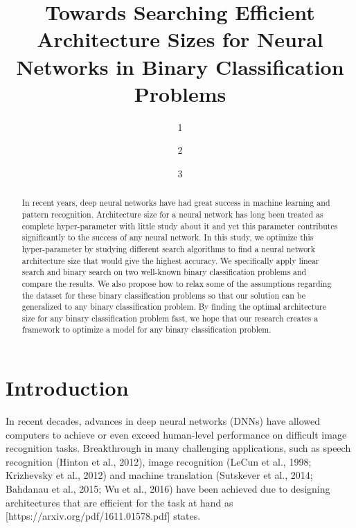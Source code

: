 \documentclass[runningheads]{llncs}
\begin{document}
%
\title{Towards Searching Efficient Architecture Sizes for Neural Networks in Binary Classification Problems}
\author{1
\and 2
\and 3}
%
\titlerunning{}
%
%
%
%
\maketitle              %
%
\begin{abstract}

In recent years, deep neural networks have had great success in machine learning and pattern recognition. Architecture size for a neural network has long been treated as complete hyper-parameter with little study about it and yet this parameter contributes significantly to the success of any neural network. In this study, we optimize this hyper-parameter by studying different search algorithms to find a neural network architecture size that would give the highest accuracy. We specifically apply linear search and binary search on two well-known binary classification problems and compare the results. We also propose how to relax some of the assumptions regarding the dataset for these binary classification problems so that our solution can be generalized to any binary classification problem. By finding the optimal architecture size for any binary classification problem fast, we hope that our research creates a framework to optimize a model for any binary classification problem.

\end{abstract}
% 
%
%
\section{Introduction}
In recent decades, advances in deep neural networks (DNNs) have allowed computers to achieve or even exceed human-level performance on difficult image recognition tasks. 
Breakthrough in many challenging applications, such as speech recognition (Hinton et al., 2012), image recognition (LeCun et al., 1998;
Krizhevsky et al., 2012) and machine translation (Sutskever et al., 2014; Bahdanau et al., 2015; Wu
et al., 2016) have been achieved due to designing architectures that are efficient for the task at hand as [https://arxiv.org/pdf/1611.01578.pdf] states.
\end{document}
